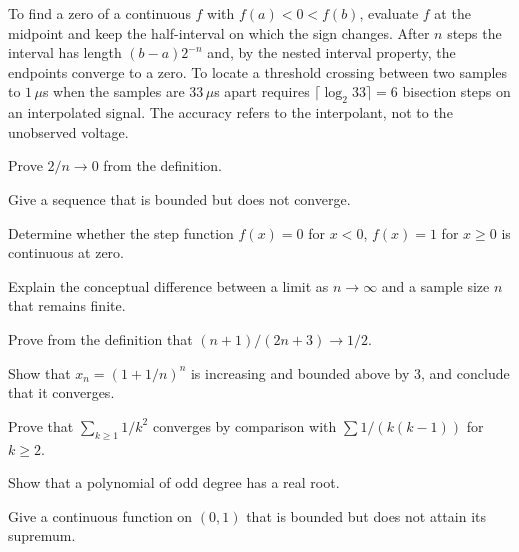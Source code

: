 \begin{workedexample}
To find a zero of a continuous $f$ with $f(a)<0<f(b)$, evaluate $f$ at the midpoint and keep the half-interval on which the sign changes. After $n$ steps the interval has length $(b-a)2^{-n}$ and, by the nested interval property, the endpoints converge to a zero. To locate a threshold crossing between two samples to $1\,\mu$s when the samples are $33\,\mu$s apart requires $\lceil\log_2 33\rceil=6$ bisection steps on an interpolated signal. The accuracy refers to the interpolant, not to the unobserved voltage.
\end{workedexample}
\begin{exercises}
\item Prove $2/n\to0$ from the definition.
\item Give a sequence that is bounded but does not converge.
\item Determine whether the step function $f(x)=0$ for $x<0$, $f(x)=1$ for $x\ge0$ is continuous at zero.
\item Explain the conceptual difference between a limit as $n\to\infty$ and a sample size $n$ that remains finite.
\item Prove from the definition that $(n+1)/(2n+3)\to1/2$.
\item Show that $x_n=(1+1/n)^n$ is increasing and bounded above by $3$, and conclude that it converges.
\item Prove that $\sum_{k\ge1}1/k^2$ converges by comparison with $\sum 1/(k(k-1))$ for $k\ge2$.
\item Show that a polynomial of odd degree has a real root.
\item Give a continuous function on $(0,1)$ that is bounded but does not attain its supremum.
\end{exercises}
